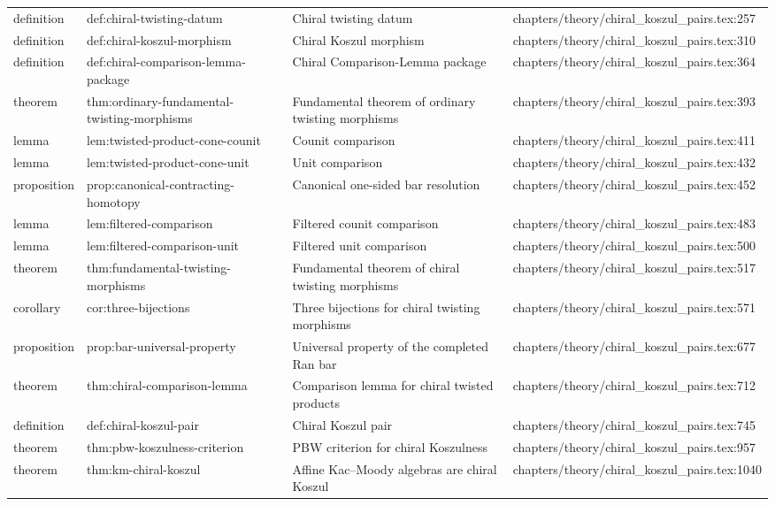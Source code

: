 \documentclass[11pt]{article}
\begin{document}
\begin{longtable}{L{0.10\textwidth}L{0.26\textwidth}L{0.42\textwidth}L{0.22\textwidth}}
definition & def:chiral-twisting-datum & Chiral twisting datum & chapters/theory/chiral\_koszul\_pairs.tex:257\\
definition & def:chiral-koszul-morphism & Chiral Koszul morphism & chapters/theory/chiral\_koszul\_pairs.tex:310\\
definition & def:chiral-comparison-lemma-package & Chiral Comparison-Lemma package & chapters/theory/chiral\_koszul\_pairs.tex:364\\
theorem & thm:ordinary-fundamental-twisting-morphisms & Fundamental theorem of ordinary twisting morphisms & chapters/theory/chiral\_koszul\_pairs.tex:393\\
lemma & lem:twisted-product-cone-counit & Counit comparison & chapters/theory/chiral\_koszul\_pairs.tex:411\\
lemma & lem:twisted-product-cone-unit & Unit comparison & chapters/theory/chiral\_koszul\_pairs.tex:432\\
proposition & prop:canonical-contracting-homotopy & Canonical one-sided bar resolution & chapters/theory/chiral\_koszul\_pairs.tex:452\\
lemma & lem:filtered-comparison & Filtered counit comparison & chapters/theory/chiral\_koszul\_pairs.tex:483\\
lemma & lem:filtered-comparison-unit & Filtered unit comparison & chapters/theory/chiral\_koszul\_pairs.tex:500\\
theorem & thm:fundamental-twisting-morphisms & Fundamental theorem of chiral twisting morphisms & chapters/theory/chiral\_koszul\_pairs.tex:517\\
corollary & cor:three-bijections & Three bijections for chiral twisting morphisms & chapters/theory/chiral\_koszul\_pairs.tex:571\\
proposition & prop:bar-universal-property & Universal property of the completed Ran bar & chapters/theory/chiral\_koszul\_pairs.tex:677\\
theorem & thm:chiral-comparison-lemma & Comparison lemma for chiral twisted products & chapters/theory/chiral\_koszul\_pairs.tex:712\\
definition & def:chiral-koszul-pair & Chiral Koszul pair & chapters/theory/chiral\_koszul\_pairs.tex:745\\
theorem & thm:pbw-koszulness-criterion & PBW criterion for chiral Koszulness & chapters/theory/chiral\_koszul\_pairs.tex:957\\
theorem & thm:km-chiral-koszul & Affine Kac--Moody algebras are chiral Koszul & chapters/theory/chiral\_koszul\_pairs.tex:1040\\

\end{longtable}
\end{document}
